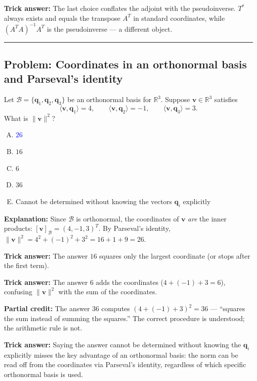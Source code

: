 \documentclass[12pt]{amsart}
\newcommand{\divider}{
  \vspace{-1em}
  \noindent
  \raisebox{-0.15ex}{\textbullet}%
  \hspace{0.5em}%
  \rule[0.5ex]{0.95\textwidth}{1.0pt}%
  \hspace{0.5em}%
  \raisebox{-0.15ex}{\textbullet}%
  \vspace{0em}
}
\begin{document}
\textbf{Trick answer:}
The last choice conflates the adjoint with the pseudoinverse.
$T^*$ always exists and equals the transpose $A^T$ in standard coordinates,
while $(A^TA)^{-1}A^T$ is the pseudoinverse --- a different object.

\divider

\subsection*{Problem: Coordinates in an orthonormal basis and Parseval's identity}

Let $\mathcal{B} = \{\mathbf{q}_1, \mathbf{q}_2, \mathbf{q}_3\}$ be an orthonormal basis
for $\mathbb{R}^3$.
Suppose $\mathbf{v} \in \mathbb{R}^3$ satisfies
$$\langle \mathbf{v}, \mathbf{q}_1 \rangle = 4, \qquad
  \langle \mathbf{v}, \mathbf{q}_2 \rangle = -1, \qquad
  \langle \mathbf{v}, \mathbf{q}_3 \rangle = 3.$$
What is $\|\mathbf{v}\|^2$?

\begin{enumerate}[(A)]
\item \textcolor{blue}{\textbf{$26$}}
\item $16$
\item $6$
\item $36$
\item Cannot be determined without knowing the vectors $\mathbf{q}_i$ explicitly
\end{enumerate}

\textbf{Explanation:}
Since $\mathcal{B}$ is orthonormal, the coordinates of $\mathbf{v}$ \emph{are} the
inner products: $[\mathbf{v}]_\mathcal{B} = (4,-1,3)^T$.
By Parseval's identity,
$\|\mathbf{v}\|^2 = 4^2 + (-1)^2 + 3^2 = 16 + 1 + 9 = 26$.

\textbf{Trick answer:}
The answer $16$ squares only the largest coordinate (or stops after the first
term).

\textbf{Trick answer:}
The answer $6$ adds the coordinates ($4+(-1)+3=6$), confusing $\|\mathbf{v}\|^2$
with the sum of the coordinates.

\textbf{Partial credit:}
The answer $36$ computes $(4+(-1)+3)^2 = 36$ --- ``squares the sum instead of
summing the squares.''
The correct procedure is understood; the arithmetic rule is not.

\textbf{Trick answer:}
Saying the answer cannot be determined without knowing the $\mathbf{q}_i$ explicitly
misses the key advantage of an orthonormal basis: the norm can be read off
from the coordinates via Parseval's identity, regardless of which specific
orthonormal basis is used.
\end{document}
